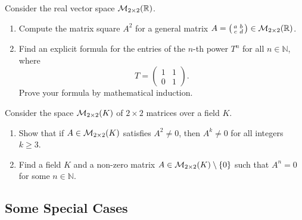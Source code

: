 \begin{exercise}
\label{exc:matrix_powers_2x2}
Consider the real vector space $\mathcal{M}_{2 \times 2}(\mathbb{R})$.
\begin{enumerate}
    \item Compute the matrix square $A^2$ for a general matrix $A = \left(\begin{smallmatrix} a & b \\ c & d \end{smallmatrix}\right) \in \mathcal{M}_{2 \times 2}(\mathbb{R})$.
    \item Find an explicit formula for the entries of the $n$-th power $T^n$ for all $n \in \mathbb{N}$, where
    \[
    T = \begin{pmatrix} 1 & 1 \\ 0 & 1 \end{pmatrix}.
    \]
    Prove your formula by mathematical induction.
\end{enumerate}
\end{exercise}

\begin{exercise}
\label{exc:powers_2x2_nilpotency}
Consider the space $\mathcal{M}_{2 \times 2}(K)$ of $2 \times 2$ matrices over a field $K$.
\begin{enumerate}
    \item Show that if $A \in \mathcal{M}_{2 \times 2}(K)$ satisfies $A^2 \ne 0$, then $A^k \ne 0$ for all integers $k \ge 3$.
    \item Find a field $K$ and a non-zero matrix $A \in \mathcal{M}_{2 \times 2}(K) \setminus \{0\}$ such that $A^n = 0$ for some $n \in \mathbb{N}$.
\end{enumerate}
\end{exercise}

\subsection{Some Special Cases}

